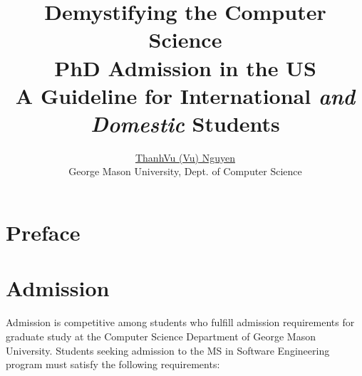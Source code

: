 \documentclass[oneside,11pt]{memoir}
\title{Demystifying the Computer Science \\
  PhD Admission in the US\\{\large A Guideline for International \emph{and Domestic} Students}}
\author{\href{https://nguyenthanhvuh.github.io}{ThanhVu (Vu) Nguyen}\\{\small George Mason University, Dept. of Computer Science}}
\makeatletter
\def\maketitle{%
  \null
  \thispagestyle{empty}%
  \vfill
  \begin{center}\leavevmode
    \normalfont
    {\LARGE\raggedright \textbf{\@title}\par}%
    \vfill%
    {\Large \@author\par}%
    \vfill%
    {\large\raggedleft \@date\par}%
  \end{center}%
  \vfill
  \null
  \cleardoublepage
}
\makeatother
\begin{document}
\maketitle
\frontmatter

\chapter{Preface}

\newpage
\tableofcontents*

\mainmatter

\chapter{Admission}

Admission is competitive among students who fulfill admission requirements for graduate study at the Computer Science Department of George Mason University.
Students seeking admission to the MS in Software Engineering program must satisfy the following requirements:
\end{document}
